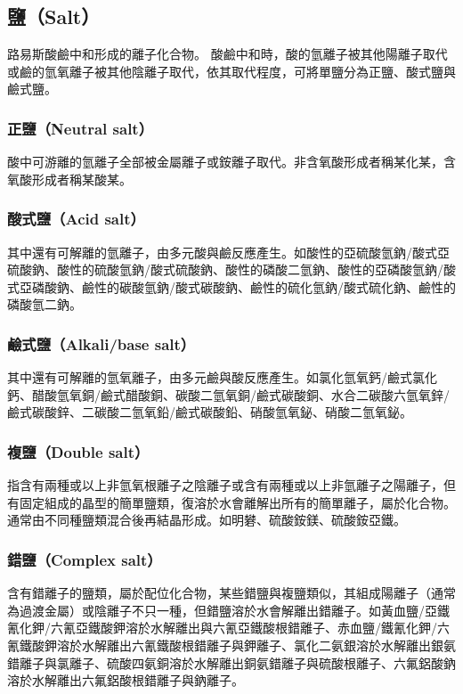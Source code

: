 \documentclass[a4paper,12pt]{article}
\begin{document}
\subsection{鹽（Salt）}
路易斯酸鹼中和形成的離子化合物。
酸鹼中和時，酸的氫離子被其他陽離子取代或鹼的氫氧離子被其他陰離子取代，依其取代程度，可將單鹽分為正鹽、酸式鹽與鹼式鹽。
\subsubsection{正鹽（Neutral salt）}
酸中可游離的氫離子全部被金屬離子或銨離子取代。非含氧酸形成者稱某化某，含氧酸形成者稱某酸某。
\subsubsection{酸式鹽（Acid salt）}
其中還有可解離的氫離子，由多元酸與鹼反應產生。如酸性的亞硫酸氫鈉/酸式亞硫酸鈉、酸性的硫酸氫鈉/酸式硫酸鈉、酸性的磷酸二氫鈉、酸性的亞磷酸氫鈉/酸式亞磷酸鈉、鹼性的碳酸氫鈉/酸式碳酸鈉、鹼性的硫化氫鈉/酸式硫化鈉、鹼性的磷酸氫二鈉。
\subsubsection{鹼式鹽（Alkali/base salt）}
其中還有可解離的氫氧離子，由多元鹼與酸反應產生。如氯化氫氧鈣/鹼式氯化鈣、醋酸氫氧銅/鹼式醋酸銅、碳酸二氫氧銅/鹼式碳酸銅、水合二碳酸六氫氧鋅/鹼式碳酸鋅、二碳酸二氫氧鉛/鹼式碳酸鉛、硝酸氫氧鉍、硝酸二氫氧鉍。
\subsubsection{複鹽（Double salt）}
指含有兩種或以上非氫氧根離子之陰離子或含有兩種或以上非氫離子之陽離子，但有固定組成的晶型的簡單鹽類，復溶於水會離解出所有的簡單離子，屬於化合物。通常由不同種鹽類混合後再結晶形成。如明礬、硫酸銨鎂、硫酸銨亞鐵。
\subsubsection{錯鹽（Complex salt）}
含有錯離子的鹽類，屬於配位化合物，某些錯鹽與複鹽類似，其組成陽離子（通常為過渡金屬）或陰離子不只一種，但錯鹽溶於水會解離出錯離子。如黃血鹽/亞鐵氰化鉀/六氰亞鐵酸鉀溶於水解離出與六氰亞鐵酸根錯離子、赤血鹽/鐵氰化鉀/六氰鐵酸鉀溶於水解離出六氰鐵酸根錯離子與鉀離子、氯化二氨銀溶於水解離出銀氨錯離子與氯離子、硫酸四氨銅溶於水解離出銅氨錯離子與硫酸根離子、六氟鋁酸鈉溶於水解離出六氟鋁酸根錯離子與鈉離子。
\end{document}
